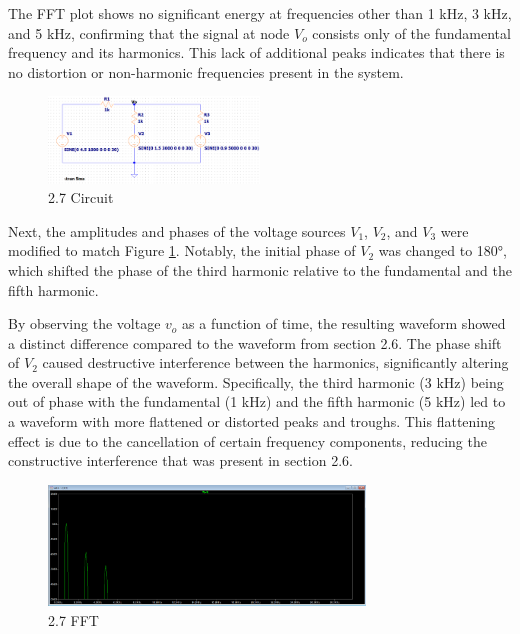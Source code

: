 \documentclass{article}
\begin{document}
The FFT plot shows no significant energy at frequencies other than 1 kHz, 3 kHz, and 5 kHz, confirming 
that the signal at node \(V_o\) consists only of the fundamental frequency and its harmonics. This lack 
of additional peaks indicates that there is no distortion or non-harmonic frequencies present in the system.
\newline

\begin{figure}[H]
	\centering
	\includegraphics[width=0.5\textwidth]{26circuit.png}
	\caption{2.7 Circuit}
	\label{fig:fig8}
\end{figure}

Next, the amplitudes and phases of the voltage sources \(V_1\), \(V_2\), and \(V_3\) were modified to match Figure \ref{fig:fig8}. 
Notably, the initial phase of \(V_2\) was changed to 180°, which shifted the phase of the third harmonic relative to the fundamental 
and the fifth harmonic.
\newline

By observing the voltage \(v_o\) as a function of time, the resulting waveform showed a distinct difference 
compared to the waveform from section 2.6. The phase shift of \(V_2\) caused destructive interference between 
the harmonics, significantly altering the overall shape of the waveform. Specifically, the third harmonic (3 kHz) 
being out of phase with the fundamental (1 kHz) and the fifth harmonic (5 kHz) led to a waveform with more flattened 
or distorted peaks and troughs. This flattening effect is due to the cancellation of certain frequency components, 
reducing the constructive interference that was present in section 2.6.
\newline

\begin{figure}[H]
	\centering
	\includegraphics[width=0.75\textwidth]{Copy of Lab 4 - 2.7.PNG}
	\caption{2.7 FFT}
	\label{fig:fig9}
\end{figure}
\end{document}
